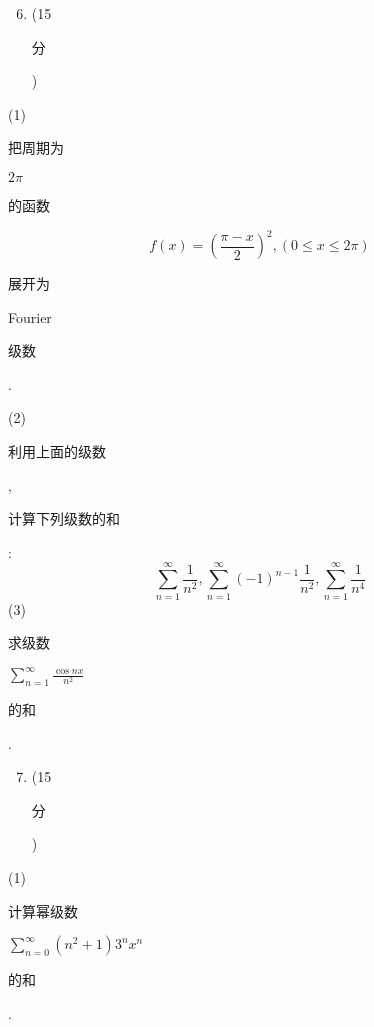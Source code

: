 \documentclass[10pt]{article}
\begin{document}
\begin{enumerate}
  \setcounter{enumi}{5}
  \item (15 \begin{CJK}{UTF8}{mj}分\end{CJK})
\end{enumerate}
(1) \begin{CJK}{UTF8}{mj}把周期为\end{CJK} $2 \pi$ \begin{CJK}{UTF8}{mj}的函数\end{CJK}
$$
f(x)=\left(\frac{\pi-x}{2}\right)^{2},(0 \leqslant x \leqslant 2 \pi)
$$
\begin{CJK}{UTF8}{mj}展开为\end{CJK} Fourier \begin{CJK}{UTF8}{mj}级数\end{CJK}.

(2) \begin{CJK}{UTF8}{mj}利用上面的级数\end{CJK}, \begin{CJK}{UTF8}{mj}计算下列级数的和\end{CJK}:
$$
\sum_{n=1}^{\infty} \frac{1}{n^{2}}, \sum_{n=1}^{\infty}(-1)^{n-1} \frac{1}{n^{2}}, \sum_{n=1}^{\infty} \frac{1}{n^{4}}
$$
(3) \begin{CJK}{UTF8}{mj}求级数\end{CJK} $\sum_{n=1}^{\infty} \frac{\cos n x}{n^{2}}$ \begin{CJK}{UTF8}{mj}的和\end{CJK}.

\begin{enumerate}
  \setcounter{enumi}{6}
  \item (15 \begin{CJK}{UTF8}{mj}分\end{CJK})
\end{enumerate}
(1) \begin{CJK}{UTF8}{mj}计算幂级数\end{CJK} $\sum_{n=0}^{\infty}\left(n^{2}+1\right) 3^{n} x^{n}$ \begin{CJK}{UTF8}{mj}的和\end{CJK}.
\end{document}
